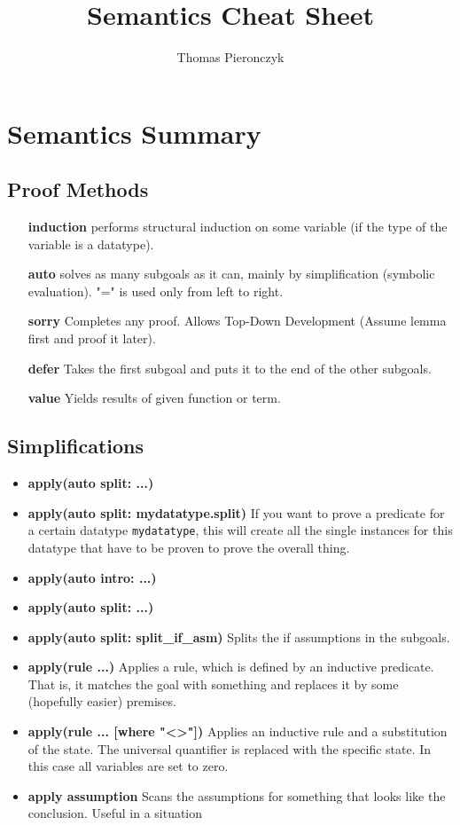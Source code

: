 \documentclass{article}
\title{Semantics Cheat Sheet}
\author{Thomas Pieronczyk}
\begin{document}
\maketitle
\section{Semantics Summary}
\subsection{Proof Methods}
\begin{itemize}
	\item [\textbf{induction}] performs structural induction on some variable (if the type of the variable is a datatype).
	\item [\textbf{auto}] solves as many subgoals as it can, mainly by simplification (symbolic evaluation). "=" is used only from left to right.
	\item [\textbf{sorry}] Completes any proof. Allows Top-Down Development (Assume lemma first and proof it later).
	\item [\textbf{defer}] Takes the first subgoal and puts it to the end of the other subgoals.
	\item [\textbf{value}] Yields results of given function or term.
\end{itemize}

\subsection{Simplifications}

\begin{itemize}
	\item \textbf{apply(auto split: ...)}
	\item \textbf{apply(auto split: mydatatype.split)} If you want to prove a predicate for a certain datatype \texttt{mydatatype}, this will create all the single instances for this datatype that have to be proven to prove the overall thing.
	\item \textbf{apply(auto intro: ...)}
	\item \textbf{apply(auto split: ...)}
	\item \textbf{apply(auto split: split\_if\_asm)} Splits the if assumptions in the subgoals.
	\item \textbf{apply(rule ...)} Applies a rule, which is defined by an inductive predicate. That is, it matches the goal with something and replaces it by some (hopefully easier) premises.
	\item \textbf{apply(rule ... [where "\textless\textgreater"])} Applies an inductive rule and a substitution of the state. The universal quantifier is replaced with the specific state. In this case all variables are set to zero.
	\item \textbf{apply assumption} Scans the assumptions for something that looks like the conclusion. Useful in a situation
\end{itemize}
\end{document}
